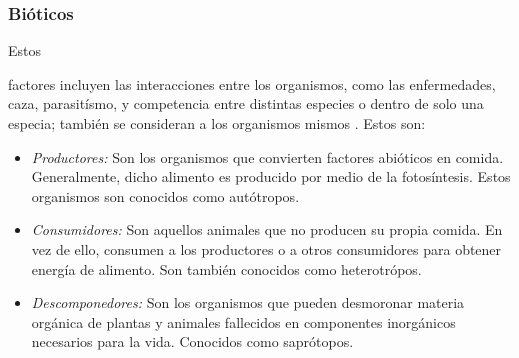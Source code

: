 \documentclass[stu, 12pt, letterpaper, donotrepeattitle, floatsintext, natbib]{apa7}
\begin{document}
\subsubsection{Bióticos}
Estos \begin{justifying}
    factores incluyen las interacciones entre los organismos, como las enfermedades, caza, parasitísmo, y competencia entre distintas especies o dentro de solo una especia; también se consideran a los organismos mismos \citep{spanner-no-date}. Estos son:
    \begin{itemize}
        \item \emph{Productores:} Son los organismos que convierten factores abióticos en comida. Generalmente, dicho alimento es producido por medio de la fotosíntesis. Estos organismos son conocidos como autótropos.
        \item \emph{Consumidores:} Son aquellos animales que no producen su propia comida. En vez de ello, consumen a los productores o a otros consumidores para obtener energía de alimento. Son también conocidos como heterotrópos.
        \item \emph{Descomponedores:} Son los organismos que pueden desmoronar materia orgánica de plantas y animales fallecidos en componentes inorgánicos necesarios para la vida. Conocidos como saprótopos.
    \end{itemize}
\end{justifying}
\vspace{\baselineskip}
\end{document}

